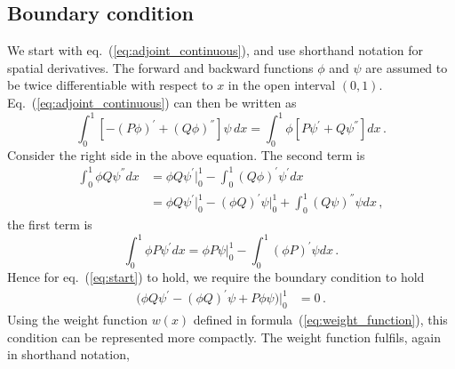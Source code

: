 \documentclass[preprint]{elsarticle}
\begin{document}
\subsection{Boundary condition}\label{section:is_adjoint?}

We start with eq.~(\ref{eq:adjoint_continuous}), and use shorthand notation for spatial derivatives.  The forward and backward functions $\phi$ and $\psi$ are assumed to be twice differentiable with respect to $x$ in the open interval $(0,1)$. Eq.~(\ref{eq:adjoint_continuous}) can then be written as
\begin{equation}\label{eq:start}
\int_0^1  \left[-(P\phi)^{'}+(Q\phi)^{''}\right] \psi\, dx=
\int_0^1  \phi \left[P\psi^{'}+Q\psi^{''}\right] dx\,.
\end{equation}
Consider the right side in the above equation. The second term is
\begin{equation}
\begin{split}
\int_0^1  \phi Q\psi^{''} dx&=
\phi Q\psi^{'}\big|_0^1-\int_0^1  (Q\phi)^{'}\psi^{'} dx\\
&=\phi Q\psi^{'}\big|_0^1-(\phi Q)^{'}\psi\big|_0^1+\int_0^1  (Q\psi)^{''}\psi dx\,,
\end{split}
\end{equation}
the first term is 
\begin{equation}
\int_0^1  \phi P\psi^{'} dx= \phi P\psi\big|_0^1 -\int_0^1  (\phi P)^{'}\psi dx\,.
\end{equation}
Hence for eq.~(\ref{eq:start}) to hold, we require the boundary condition to hold
\begin{equation}\label{eq:bound_cond_1}
\begin{split}
\big(\phi Q\psi^{'}-(\phi Q)^{'}\psi+P\phi\psi\big)\big|_0^1&=0\,.
\end{split}
\end{equation}
Using the weight function $w(x)$ defined in formula~(\ref{eq:weight_function}), this condition can be represented more compactly. The weight function fulfils, again in shorthand notation, 
\end{document}
